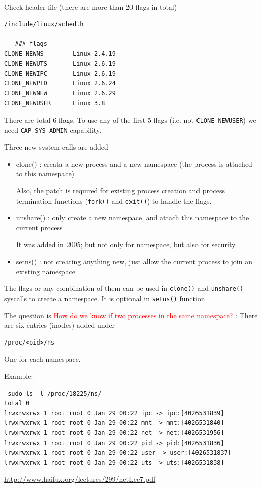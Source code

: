 Check header file (there are more than 20 flags in total)
\begin{verbatim}
/include/linux/sched.h  

   ### flags
CLONE_NEWNS        Linux 2.4.19
CLONE_NEWUTS       Linux 2.6.19
CLONE_NEWIPC       Linux 2.6.19
CLONE_NEWPID       Linux 2.6.24
CLONE_NEWNEW       Linux 2.6.29
CLONE_NEWUSER      Linux 3.8
  \end{verbatim}
There are total 6 flags. To use any of the first 5 flags (i.e. not
\verb!CLONE_NEWUSER!) we need \verb!CAP_SYS_ADMIN! capability.

Three new system calls are added
\begin{itemize}
  \item clone()  : creata a new process and a new namespace (the process is
  attached to this namespace)

Also, the patch is required for existing process creation and process
termination functions (\verb!fork()! and \verb!exit()!) to handle the flags.

  \item unshare() : only create a new namespace, and attach this namespace to
  the current process
  
  It was added in 2005; but not only for namespace, but also for security
  
  \item setns() : not creating anything new, just allow the current process to
  join an existing namespace
\end{itemize}
The flags or any combination of them can be used in
\verb!clone()! and \verb!unshare()! syscalls to create a namespace.
It is optional in \verb!setns()! function.

The question is \textcolor{red}{How do we know if two processes in the same
namespace? }: There are six entries (inodes) added under 
\begin{verbatim}
/proc/<pid>/ns
\end{verbatim}
One for each namespace.

Example: 
\begin{verbatim}
 sudo ls -l /proc/18225/ns/
total 0
lrwxrwxrwx 1 root root 0 Jan 29 00:22 ipc -> ipc:[4026531839]
lrwxrwxrwx 1 root root 0 Jan 29 00:22 mnt -> mnt:[4026531840]
lrwxrwxrwx 1 root root 0 Jan 29 00:22 net -> net:[4026531956]
lrwxrwxrwx 1 root root 0 Jan 29 00:22 pid -> pid:[4026531836]
lrwxrwxrwx 1 root root 0 Jan 29 00:22 user -> user:[4026531837]
lrwxrwxrwx 1 root root 0 Jan 29 00:22 uts -> uts:[4026531838]
\end{verbatim}
\url{http://www.haifux.org/lectures/299/netLec7.pdf}


